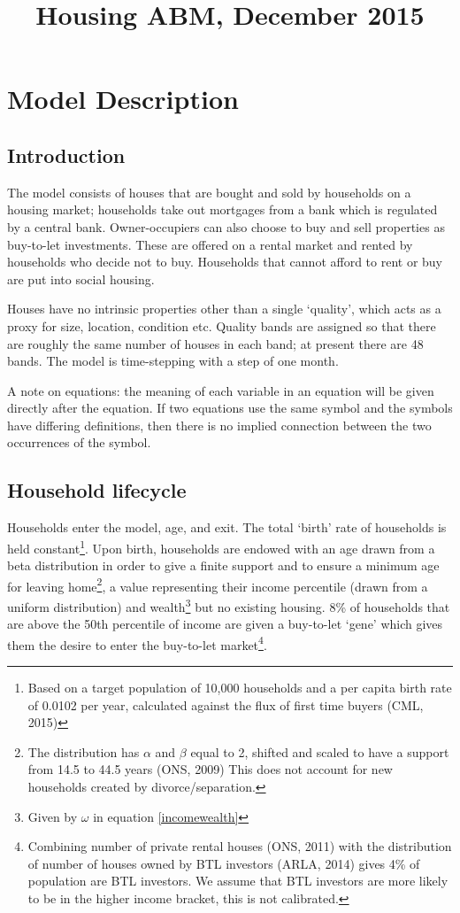 \documentclass{report}
\begin{document}
\title{Housing ABM, December 2015}
\maketitle
\tableofcontents
\chapter{Model Description}

\section{Introduction}
The model consists of houses that are bought and sold by households on a housing market; households take out mortgages from a bank which is regulated by a central bank. Owner-occupiers can also choose to buy and sell properties as buy-to-let investments. These are offered on a rental market and rented by households who decide not to buy. Households that cannot afford to rent or buy are put into social housing.

Houses have no intrinsic properties other than a single `quality', which acts as a proxy for size, location, condition etc. Quality bands are assigned so that there are roughly the same number of houses in each band; at present there are 48 bands. The model is time-stepping with a step of one month.

A note on equations: the meaning of each variable in an equation will be given directly after the equation. If two equations use the same symbol and the symbols have differing definitions, then there is no implied connection between the two occurrences of the symbol.

\section{Household lifecycle}
\label{lifecycle}
Households enter the model, age, and exit. The total `birth' rate of households is held constant\footnote{Based on a target population of 10,000 households and a per capita birth rate of 0.0102 per year, calculated against the flux of first time buyers (CML, 2015)}. Upon birth, households are endowed with an age drawn from a beta distribution in order to give a finite support and to ensure a minimum age for leaving home\footnote{The distribution has $\alpha$ and $\beta$ equal to 2, shifted and scaled to have a support from 14.5 to 44.5 years (ONS, 2009) This does not account for new households created by divorce/separation.}, a value representing their income percentile (drawn from a uniform distribution) and wealth\footnote{Given by $\omega$ in equation \ref{incomewealth}} but no existing housing. 8\% of households that are above the 50th percentile of income are given a buy-to-let `gene' which gives them the desire to enter the buy-to-let market\footnote{Combining number of private rental houses (ONS, 2011) with the distribution of number of houses owned by BTL investors (ARLA, 2014) gives 4\% of population are BTL investors. We assume that BTL investors are more likely to be in the higher income bracket, this is not calibrated.}.
\end{document}
